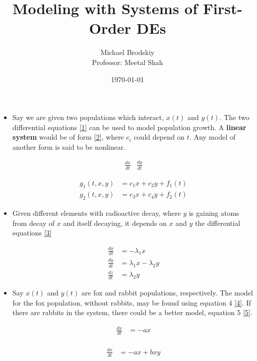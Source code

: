 \documentclass[12pt]{article}
\title{Modeling with Systems of First-Order DEs}
\date{\today}
\author{Michael Brodskiy\\ \small Professor: Meetal Shah}
\begin{document}
\maketitle

\begin{itemize}

  \item Say we are given two populations which interact, $x(t)$ and $y(t)$. The two differential equations \eqref{1} can be used to model population growth. A \textbf{linear system} would be of form \eqref{2}, where $c_i$ could depend on $t$. Any model of another form is said to be nonlinear.

    \begin{equation}
      \begin{split}
        \frac{dx}{dt} & \frac{dy}{dt}
      \end{split}
      \label{1}
    \end{equation}

    \begin{equation}
      \begin{split}
        g_1(t,x,y) & = c_1x+c_2y+f_1(t) \\
        g_2(t,x,y) & = c_3x+c_4y+f_2(t)
      \end{split}
      \label{2}
    \end{equation}


  \item Given different elements with radioactive decay, where $y$ is gaining atoms from decay of $x$ and itself decaying, it depends on $x$ and $y$ the differential equations \eqref{3}

    \begin{equation}
      \begin{split}
        \frac{dx}{dt} & = -\lambda_1x \\
        \frac{dy}{dt} & = \lambda_1x-\lambda_2y \\
        \frac{dz}{dt} & = \lambda_2y 
      \end{split}
      \label{3}
    \end{equation}

  \item Say $x(t)$ and $y(t)$ are fox and rabbit populations, respectively. The model for the fox population, without rabbits, may be found using equation 4 \eqref{4}. If there are rabbits in the system, there could be a better model, equation 5 \eqref{5}.

    \begin{equation}
      \begin{split}
        \frac{dx}{dt} & = -ax \\
      \end{split}
      \label{4}
    \end{equation}

    \begin{equation}
      \begin{split}
        \frac{dx}{dt} & = -ax+bxy \\
      \end{split}
      \label{5}
    \end{equation}



\end{itemize}
\end{document}

